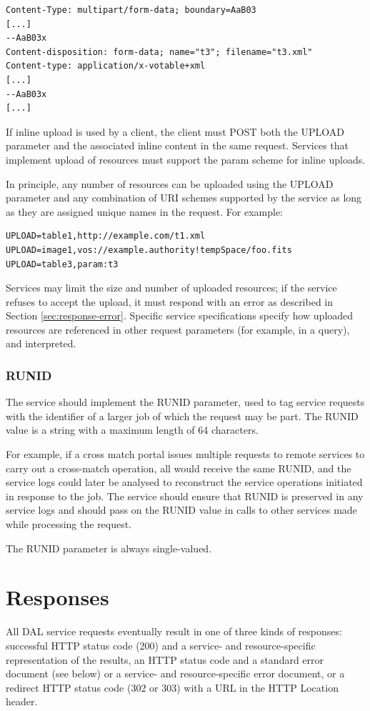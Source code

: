 \documentclass[11pt,letter]{ivoa}
\begin{document}
\begin{verbatim}
Content-Type: multipart/form-data; boundary=AaB03
[...]
--AaB03x
Content-disposition: form-data; name="t3"; filename="t3.xml"
Content-type: application/x-votable+xml
[...]
--AaB03x
[...]
\end{verbatim}

If inline upload is used by a client, the client must POST both the UPLOAD 
parameter and the associated inline content in the same request. Services that 
implement upload of resources must support the param scheme for inline uploads.

In principle, any number of resources can be uploaded using the UPLOAD parameter 
and any combination of URI schemes supported by the service as long as they are 
assigned unique names in the request. For example:

\begin{verbatim}
UPLOAD=table1,http://example.com/t1.xml
UPLOAD=image1,vos://example.authority!tempSpace/foo.fits
UPLOAD=table3,param:t3
\end{verbatim}

Services may limit the size and number of uploaded resources; if the service 
refuses to accept the upload, it must respond with an error as described in 
Section \ref{sec:response-error}. Specific service specifications specify how uploaded resources are 
referenced in other request parameters (for example, in a query), and 
interpreted.

\subsubsection{RUNID}
\label{sec:RUNID}
The service should implement the RUNID parameter, used to tag service requests 
with the identifier of a larger job of which the request may be part. The RUNID 
value is a string with a maximum length of 64 characters.

For example, if a cross match portal issues multiple requests to remote services 
to carry out a cross-match operation, all would receive the same RUNID, and the 
service logs could later be analysed to reconstruct the service operations 
initiated in response to the job. The service should ensure that RUNID is 
preserved in any service logs and  should pass on the RUNID value in calls to 
other services made while processing the request.

The RUNID parameter is always single-valued.

\section{Responses}
\label{sec:responses}
All DAL service requests eventually result in one of three kinds of responses: 
successful HTTP status code (200) and a service- and resource-specific 
representation of the results, an HTTP status code and a standard error document 
(see below) or a  service- and resource-specific error document, or a redirect 
HTTP status code (302 or 303) with a URL in the HTTP Location header.
\end{document}
